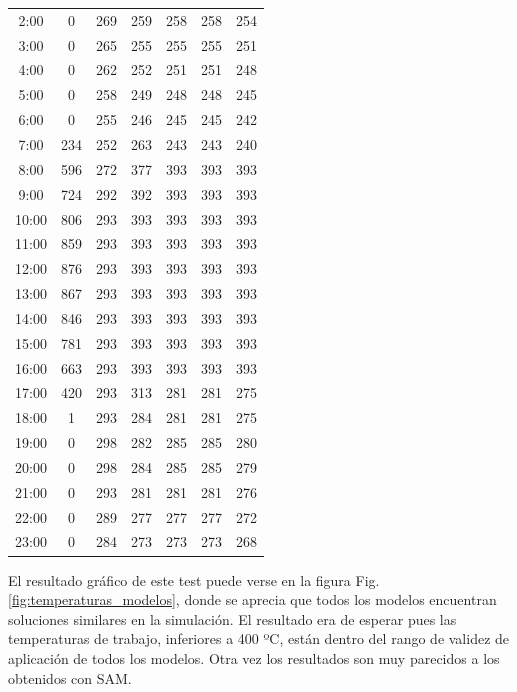 \begin{longtable}[c]{ccccccc}
2:00  & 0   & 269 & 259 & 258 & 258 & 254 \\
3:00  & 0   & 265 & 255 & 255 & 255 & 251 \\
4:00  & 0   & 262 & 252 & 251 & 251 & 248 \\
5:00  & 0   & 258 & 249 & 248 & 248 & 245 \\
6:00  & 0   & 255 & 246 & 245 & 245 & 242 \\
7:00  & 234 & 252 & 263 & 243 & 243 & 240 \\
8:00  & 596 & 272 & 377 & 393 & 393 & 393 \\
9:00  & 724 & 292 & 392 & 393 & 393 & 393 \\
10:00 & 806 & 293 & 393 & 393 & 393 & 393 \\
11:00 & 859 & 293 & 393 & 393 & 393 & 393 \\
12:00 & 876 & 293 & 393 & 393 & 393 & 393 \\
13:00 & 867 & 293 & 393 & 393 & 393 & 393 \\
14:00 & 846 & 293 & 393 & 393 & 393 & 393 \\
15:00 & 781 & 293 & 393 & 393 & 393 & 393 \\
16:00 & 663 & 293 & 393 & 393 & 393 & 393 \\
17:00 & 420 & 293 & 313 & 281 & 281 & 275 \\
18:00 & 1   & 293 & 284 & 281 & 281 & 275 \\
19:00 & 0   & 298 & 282 & 285 & 285 & 280 \\
20:00 & 0   & 298 & 284 & 285 & 285 & 279 \\
21:00 & 0   & 293 & 281 & 281 & 281 & 276 \\
22:00 & 0   & 289 & 277 & 277 & 277 & 272 \\
23:00 & 0   & 284 & 273 & 273 & 273 & 268 \\
\end{longtable}

El resultado gráfico de este test puede verse en la figura Fig.\ref{fig:temperaturas_modelos}, donde se aprecia que todos los modelos encuentran soluciones similares en la simulación. El resultado era de esperar pues las temperaturas de trabajo, inferiores a 400 ºC, están dentro del rango de validez de aplicación de todos los modelos. Otra vez los resultados son muy parecidos a los obtenidos con SAM.

